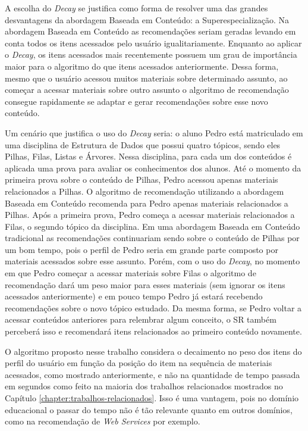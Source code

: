 A escolha do \textit{Decay} se justifica como forma de resolver uma das grandes desvantagens da abordagem Baseada em Conteúdo: a
Superespecialização. Na abordagem Baseada em Conteúdo as recomendações seriam geradas levando em conta todos os itens
acessados pelo usuário igualitariamente. Enquanto ao aplicar o \textit{Decay}, os itens acessados mais recentemente possuem um
grau de importância maior para o algoritmo do que itens acessados anteriormente. Dessa forma, mesmo que o usuário
acessou muitos materiais sobre determinado assunto, ao começar a acessar materiais sobre outro assunto o algoritmo de
recomendação consegue rapidamente se adaptar e gerar recomendações sobre esse novo conteúdo.

Um cenário que justifica o uso do \textit{Decay} seria: o aluno Pedro está matriculado em uma disciplina de Estrutura de Dados
que possui quatro tópicos, sendo eles Pilhas, Filas, Listas e Árvores. Nessa disciplina, para cada um dos conteúdos é
aplicada uma prova para avaliar os conhecimentos dos alunos. Até o momento da primeira prova sobre o conteúdo de Pilhas,
Pedro acessou apenas materiais relacionados a Pilhas. O algoritmo de recomendação utilizando a abordagem Baseada em
Conteúdo recomenda para Pedro apenas materiais relacionados a Pilhas. Após a primeira prova, Pedro começa a acessar
materiais relacionados a Filas, o segundo tópico da disciplina. Em uma abordagem Baseada em Conteúdo tradicional as
recomendações continuariam sendo sobre o conteúdo de Pilhas por um bom tempo, pois o perfil de Pedro seria em grande
parte composto por materiais acessados sobre esse assunto. Porém, com o uso do \textit{Decay}, no momento em que Pedro começar a
acessar materiais sobre Filas o algoritmo de recomendação dará um peso maior para esses materiais (sem ignorar os itens
acessados anteriormente) e em pouco tempo Pedro já estará recebendo recomendações sobre o novo tópico estudado. Da mesma
forma, se Pedro voltar a acessar conteúdos anteriores para relembrar algum conceito, o SR também perceberá isso e
recomendará itens relacionados ao primeiro conteúdo novamente.

O algoritmo proposto nesse trabalho considera o decaimento no peso dos itens do perfil do usuário em função da posição
do item na sequência de materiais acessados, como mostrado anteriormente, e não na quantidade de tempo passada em
segundos como feito na maioria dos trabalhos relacionados mostrados no Capítulo \ref{chapter:trabalhos-relacionados}. Isso é uma vantagem, pois no domínio
educacional o passar do tempo não é tão relevante quanto em outros domínios, como na recomendação de \textit{Web Services} por
exemplo.

